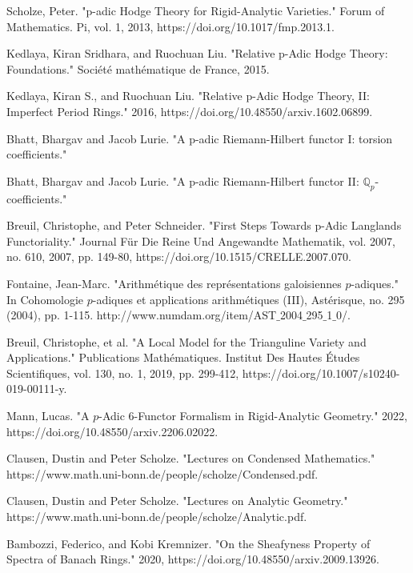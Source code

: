 \documentclass[12pt]{book}
\theoremstyle{definition}
\begin{document}
\newpage

\begin{thebibliography}{}

 Scholze, Peter. "p-adic Hodge Theory for Rigid-Analytic Varieties." Forum of Mathematics. Pi, vol. 1, 2013, https://doi.org/10.1017/fmp.2013.1.

 Kedlaya, Kiran Sridhara, and Ruochuan Liu. "Relative p-Adic Hodge Theory: Foundations." Soci\'et\'e math\'ematique de France, 2015.

 Kedlaya, Kiran S., and Ruochuan Liu. "Relative p-Adic Hodge Theory, II: Imperfect Period Rings." 2016, https://doi.org/10.48550/arxiv.1602.06899.

 Bhatt, Bhargav and Jacob Lurie. "A p-adic Riemann-Hilbert functor I: torsion coefficients."

 Bhatt, Bhargav and Jacob Lurie. "A p-adic Riemann-Hilbert functor II: $\mathbb{Q}_p$-coefficients."

 Breuil, Christophe, and Peter Schneider. "First Steps Towards p-Adic Langlands Functoriality." Journal F\"ur Die Reine Und Angewandte Mathematik, vol. 2007, no. 610, 2007, pp. 149-80, https://doi.org/10.1515/CRELLE.2007.070.

 Fontaine, Jean-Marc. "Arithm\'etique des repr\'esentations galoisiennes $p$-adiques." In Cohomologie $p$-adiques et applications arithm\'etiques (III), Ast\'erisque, no. 295 (2004), pp. 1-115. http://www.numdam.org/item/AST$\_$2004$\_$295$\_$1$\_$0/.

 Breuil, Christophe, et al. "A Local Model for the Trianguline Variety and Applications." Publications Math\'ematiques. Institut Des Hautes \'Etudes Scientifiques, vol. 130, no. 1, 2019, pp. 299-412, https://doi.org/10.1007/s10240-019-00111-y.

  Mann, Lucas. "A $p$-Adic 6-Functor Formalism in Rigid-Analytic Geometry." 2022, https://doi.org/10.48550/arxiv.2206.02022.

 Clausen, Dustin and Peter Scholze. "Lectures on Condensed Mathematics." https://www.math.uni-bonn.de/people/scholze/Condensed.pdf. 

 Clausen, Dustin and Peter Scholze. "Lectures on Analytic Geometry." https://www.math.uni-bonn.de/people/scholze/Analytic.pdf.
 
 Bambozzi, Federico, and Kobi Kremnizer. "On the Sheafyness Property of Spectra of Banach Rings." 2020, https://doi.org/10.48550/arxiv.2009.13926.


\end{thebibliography}
\end{document}
